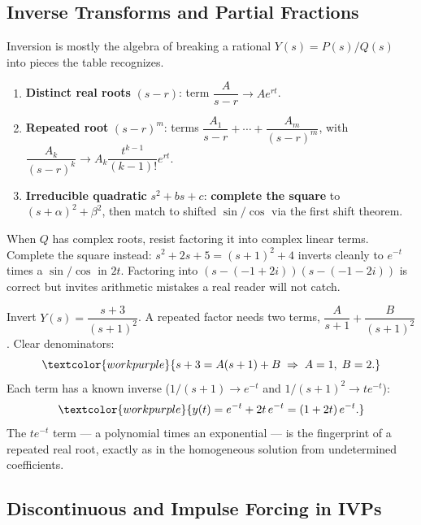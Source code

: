 \subsection{Inverse Transforms and Partial Fractions}

Inversion is mostly the algebra of breaking a rational $Y(s)=P(s)/Q(s)$ into pieces
the table recognizes.

\begin{methodbox}
\begin{enumerate}
    \item \textbf{Distinct real roots} $(s-r)$: term $\dfrac{A}{s-r}\to Ae^{rt}$.
    \item \textbf{Repeated root} $(s-r)^m$: terms $\dfrac{A_1}{s-r}+\cdots+\dfrac{A_m}{(s-r)^m}$,
          with $\dfrac{A_k}{(s-r)^k} \to A_k \dfrac{t^{k-1}}{(k-1)!}e^{rt}$.
    \item \textbf{Irreducible quadratic} $s^2+bs+c$: \textbf{complete the square} to
          $(s+\alpha)^2+\beta^2$, then match to shifted $\sin/\cos$ via the first
          shift theorem.
\end{enumerate}
\end{methodbox}

\begin{warningbox}
When $Q$ has complex roots, resist factoring it into complex linear terms. Complete
the square instead: $s^2+2s+5 = (s+1)^2+4$ inverts cleanly to $e^{-t}$ times a
$\sin/\cos$ in $2t$. Factoring into $(s-(-1+2i))(s-(-1-2i))$ is correct but invites
arithmetic mistakes a real reader will not catch.
\end{warningbox}

\begin{examplebox}
Invert $Y(s) = \dfrac{s+3}{(s+1)^2}$. A repeated factor needs two terms,
$\dfrac{A}{s+1}+\dfrac{B}{(s+1)^2}$. Clear denominators:
\[ \textcolor{workpurple}{s+3 = A(s+1) + B
   \;\Rightarrow\; A = 1,\; B = 2.} \]
Each term has a known inverse ($1/(s+1)\to e^{-t}$ and $1/(s+1)^2\to t e^{-t}$):
\[ \textcolor{workpurple}{y(t) = e^{-t} + 2t\,e^{-t} = (1+2t)\,e^{-t}.} \]
The $t e^{-t}$ term --- a polynomial times an exponential --- is the fingerprint of a
repeated real root, exactly as in the homogeneous solution from undetermined
coefficients.
\end{examplebox}

\subsection{Discontinuous and Impulse Forcing in IVPs}

